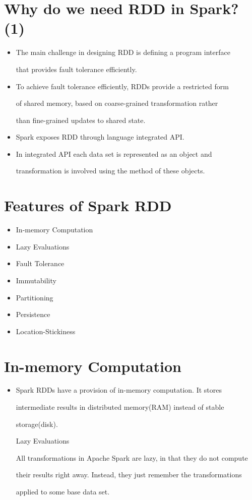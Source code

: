 \documentclass[12pt, openany]{book}
\begin{document}
\section{Why do we need RDD in Spark?(1)}
\begin{itemize}[leftmargin=*]\item The main challenge in designing RDD is defining a program interface

that provides fault tolerance efficiently.

\item To achieve fault tolerance efficiently, RDDs provide a restricted form

of shared memory, based on coarse-grained transformation rather


than fine-grained updates to shared state.

\item Spark exposes RDD through language integrated API.
\item In integrated API each data set is represented as an object and

transformation is involved using the method of these objects.
\end{itemize}

\section{Features of Spark RDD}
\begin{itemize}[leftmargin=*]\item In-memory Computation
\item Lazy Evaluations
\item Fault Tolerance
\item Immutability
\item Partitioning
\item Persistence
\item Location-Stickiness\end{itemize}

\section{In-memory Computation}
\begin{itemize}[leftmargin=*]\item Spark RDDs have a provision of in-memory computation. It stores

intermediate results in distributed memory(RAM) instead of stable


storage(disk).


Lazy Evaluations


All transformations in Apache Spark are lazy, in that they do not compute


their results right away. Instead, they just remember the transformations


applied to some base data set.
\end{itemize}
\end{document}

